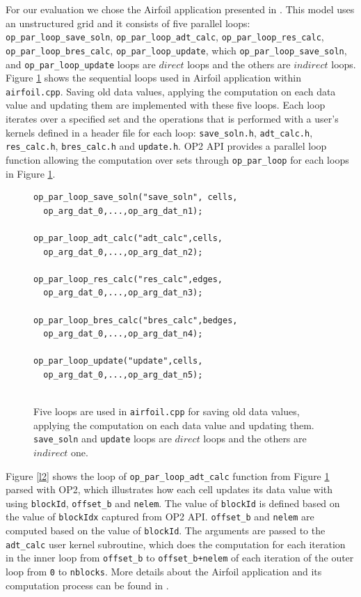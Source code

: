\documentclass[conference]{IEEEtran}
\begin{document}
For our evaluation we chose the Airfoil application presented in \cite{o8}. This model uses an unstructured grid and it consists of five parallel loops: \texttt{op\_par\_loop\_save\_soln}, \texttt{op\_par\_loop\_adt\_calc}, \texttt{op\_par\_loop\_res\_calc}, \texttt{op\_par\_loop\_bres\_calc}, \texttt{op\_par\_loop\_update}, which \texttt{op\_par\_loop\_save\_soln},  and \texttt{op\_par\_loop\_update} loops are $direct$ loops and the others are $indirect$ loops. Figure \ref{l1} shows the sequential loops used in Airfoil application within \texttt{airfoil.cpp}. Saving old data values, applying the computation on each data value and updating them are implemented with these five loops. Each loop iterates over a specified set and the operations that is performed with a user's kernels defined in a header file for each loop: \texttt{save\_soln.h}, \texttt{adt\_calc.h}, \texttt{res\_calc.h}, \texttt{bres\_calc.h} and \texttt{update.h}.  OP2 API provides a parallel loop function allowing the computation over sets through \texttt{op\_par\_loop} for each loops in Figure \ref{l1}. 

\begin{figure} [!h]
    \begin{lstlisting}
op_par_loop_save_soln("save_soln", cells,
  op_arg_dat_0,...,op_arg_dat_n1);
  
op_par_loop_adt_calc("adt_calc",cells,
  op_arg_dat_0,...,op_arg_dat_n2);
  
op_par_loop_res_calc("res_calc",edges,
  op_arg_dat_0,...,op_arg_dat_n3);

op_par_loop_bres_calc("bres_calc",bedges,
  op_arg_dat_0,...,op_arg_dat_n4);
  
op_par_loop_update("update",cells,
  op_arg_dat_0,...,op_arg_dat_n5);
  
    \end{lstlisting}
    \caption{\small{Five loops are used in \texttt{airfoil.cpp} for saving old data values, applying the computation on each data value and updating them. \texttt{save\_soln} and \texttt{update} loops are $direct$ loops and the others are $indirect$ one.}}
    \label{l1}
\end{figure}


Figure \ref{l2} shows the loop of \texttt{op\_par\_loop\_adt\_calc} function from Figure \ref{l1} parsed with OP2, which illustrates how each cell updates its data value with using \texttt{blockId}, \texttt{offset\_b} and \texttt{nelem}. The value of \texttt{blockId} is defined based on the value of \texttt{blockIdx} captured from OP2 API.  \texttt{offset\_b} and \texttt{nelem} are computed based on the value of \texttt{blockId}. The arguments are passed to the \texttt{adt\_calc} user kernel subroutine, which does the computation for each iteration in the inner loop from \texttt{offset\_b} to \texttt{offset\_b+nelem} of each iteration of the outer loop from \texttt{0} to \texttt{nblocks}. More details about the Airfoil application and its computation process can be found in \cite{o8}.
\end{document}
